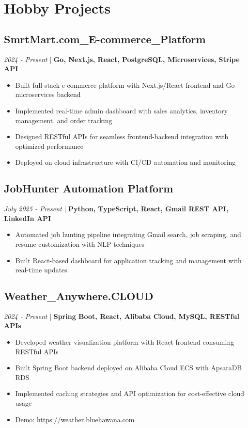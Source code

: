 \documentclass[11pt,a4paper]{article}
\begin{document}
\section*{Hobby Projects}

\subsection*{SmrtMart.com\_E-commerce\_Platform}
\textit{2024 - Present} | \textbf{Go, Next.js, React, PostgreSQL, Microservices, Stripe API}
\begin{itemize}[noitemsep]
\item Built full-stack e-commerce platform with Next.js/React frontend and Go microservices backend
\item Implemented real-time admin dashboard with sales analytics, inventory management, and order tracking
\item Designed RESTful APIs for seamless frontend-backend integration with optimized performance
\item Deployed on cloud infrastructure with CI/CD automation and monitoring
\end{itemize}

\subsection*{JobHunter Automation Platform}
\textit{July 2025 - Present} | \textbf{Python, TypeScript, React, Gmail REST API, LinkedIn API}
\begin{itemize}[noitemsep]
\item Automated job hunting pipeline integrating Gmail search, job scraping, and resume customization with NLP techniques
\item Built React-based dashboard for application tracking and management with real-time updates
\end{itemize}

\subsection*{Weather\_Anywhere.CLOUD}
\textit{2024 - Present} | \textbf{Spring Boot, React, Alibaba Cloud, MySQL, RESTful APIs}
\begin{itemize}[noitemsep]
\item Developed weather visualization platform with React frontend consuming RESTful APIs
\item Built Spring Boot backend deployed on Alibaba Cloud ECS with ApsaraDB RDS
\item Implemented caching strategies and API optimization for cost-effective cloud usage
\item Demo: https://weather.bluehawana.com
\end{itemize}
\end{document}
